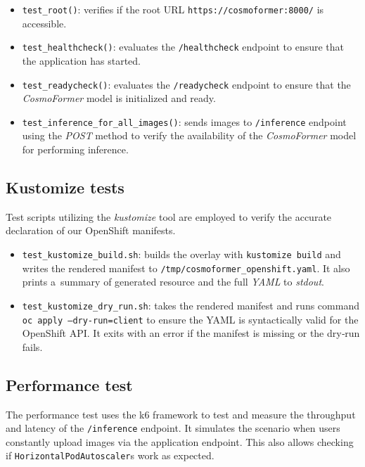 \begin{itemize}
  \item \texttt{test\_root()}: verifies if the root URL \texttt{https://cosmoformer:8000/} is accessible.
  \item \texttt{test\_healthcheck()}: evaluates the \texttt{/healthcheck} endpoint to ensure that the application has started.
  \item \texttt{test\_readycheck()}: evaluates the \texttt{/readycheck} endpoint to ensure that the \textit{CosmoFormer} model is initialized and ready.
  \item \texttt{test\_inference\_for\_all\_images()}: sends images to \texttt{/inference} endpoint using the \textit{POST} method to verify the availability of the \textit{CosmoFormer} model for performing inference.  
\end{itemize}

\subsection*{Kustomize tests}

Test scripts utilizing the \textit{kustomize} tool are employed to verify the accurate declaration of our OpenShift manifests.

\begin{itemize}
  \item \texttt{test\_kustomize\_build.sh}: builds the overlay with \texttt{kustomize build} and writes the rendered manifest to \texttt{/tmp/cosmoformer\_openshift.yaml}. It also prints a~summary of generated resource and the full \textit{YAML} to \textit{stdout}.
  \item \texttt{test\_kustomize\_dry\_run.sh}: takes the rendered manifest and runs command \texttt{oc apply --dry-run=client} to ensure the YAML is syntactically valid for the OpenShift API. It exits with an error if the manifest is missing or the dry‑run fails.
\end{itemize}

\subsection*{Performance test}

The performance test uses the k6 framework to test and measure the throughput and latency of the \texttt{/inference} endpoint. It simulates the scenario when users constantly upload images via the application endpoint. This also allows checking if \texttt{HorizontalPodAutoscaler}s  work as expected. 


